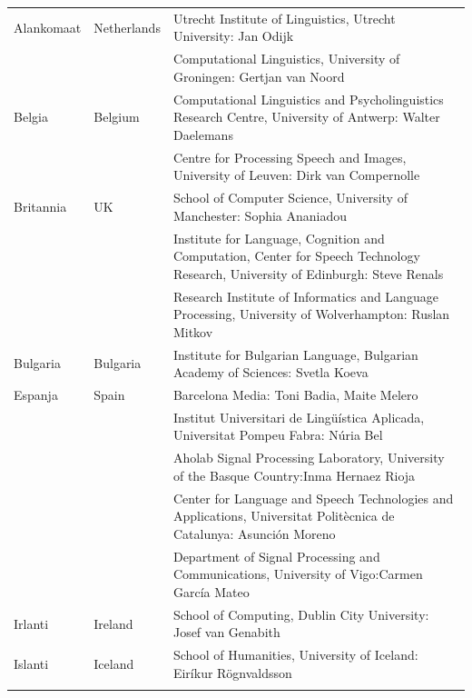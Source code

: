 \begin{longtable}{@{}llp{113mm}@{}}
Alankomaat & \textcolor{grey1}{Netherlands} & Utrecht Institute of Linguistics, Utrecht University: Jan Odijk\\ \addlinespace 
  & & Computational Linguistics, University of Groningen: Gertjan van Noord\\ \addlinespace
Belgia & \textcolor{grey1}{Belgium} & Computational Linguistics and Psycholinguistics Research Centre, University of Antwerp: Walter Daelemans\\ \addlinespace
  & & Centre for Processing Speech and Images, University of Leuven: Dirk van Compernolle \\ \addlinespace
Britannia & \textcolor{grey1}{UK} & 
  School of Computer Science, University of Manchester: Sophia Ananiadou \\ \addlinespace 
  & & Institute for Language, Cognition and Computation, Center for Speech Technology Research, University of Edinburgh: Steve Renals \\ \addlinespace 
  & & Research Institute of Informatics and Language Processing, University of Wolverhampton: Ruslan Mitkov\\ \addlinespace
Bulgaria & \textcolor{grey1}{Bulgaria} & Institute for Bulgarian Language, Bulgarian Academy of Sciences: Svetla Koeva \\ \addlinespace
Espanja & \textcolor{grey1}{Spain} & Barcelona Media: Toni Badia, Maite Melero \\ \addlinespace 
  & & Institut Universitari de Lingüística Aplicada, Universitat Pompeu Fabra: Núria Bel \\ \addlinespace 
  & & Aholab Signal Processing Laboratory, University of the Basque Country:\newline Inma Hernaez Rioja \\ \addlinespace 
  & & Center for Language and Speech Technologies and Applications, Universitat Politècnica de Catalunya:  Asunción Moreno \\ \addlinespace 
  & & Department of Signal Processing and Communications, University of Vigo:\newline Carmen García Mateo \\ \addlinespace 
Irlanti & \textcolor{grey1}{Ireland} & School of Computing, Dublin City University: Josef van Genabith\\ \addlinespace
Islanti & \textcolor{grey1}{Iceland} & School of Humanities, University of Iceland: Eiríkur Rögnvaldsson\\ \addlinespace

\end{longtable}
